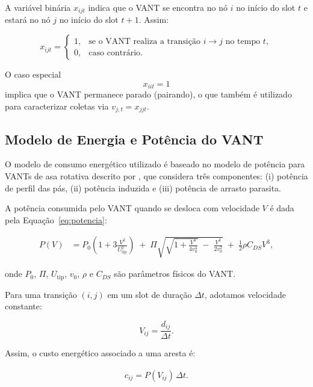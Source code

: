 \documentclass[
    12pt,
    oneside,
    a4paper,
    brazil
]{abntex2}
\begin{document}
    A variável binária $x_{ijt}$ indica que o VANT se encontra no nó $i$ no início do slot $t$ e estará no nó $j$ no início do slot $t+1$.
    Assim:

    \[
    x_{ijt} =
    \begin{cases}
    1, & \text{se o VANT realiza a transição } i \to j \text{ no tempo } t, \\[4pt]
    0, & \text{caso contrário}.
    \end{cases}
    \]

    O caso especial
    \[
    x_{iit} = 1
    \]
    implica que o VANT permanece parado (pairando), o que também é utilizado para caracterizar coletas via $v_{j,t} = x_{jjt}$.

    \subsection{Modelo de Energia e Potência do VANT}

    O modelo de consumo energético utilizado é baseado no modelo de potência para VANTs de asa rotativa descrito por \cite{zeng2019rotarywing}, que considera três componentes: (i) potência de perfil das pás, (ii) potência induzida e (iii) potência de arrasto parasita.

    A potência consumida pelo VANT quando se desloca com velocidade $V$ é dada pela Equação~\eqref{eq:potencia}:

    \begin{align}
    P(V) &=
    P_0\!\left(1 + 3\frac{V^2}{U_{\text{tip}}^2}\right)
    \;+\;
    \Pi \sqrt{
            \sqrt{1 + \frac{V^4}{4 v_0^4}}
            \;-\;
            \frac{V^2}{2 v_0^2}
        }
    \;+\;
    \frac{1}{2}\rho C_{DS} V^3 ,
    \label{eq:potencia}
    \end{align}

    onde $P_0$, $\Pi$, $U_\text{tip}$, $v_0$, $\rho$ e $C_{DS}$ são parâmetros físicos do VANT.

    Para uma transição $(i,j)$ em um slot de duração $\Delta t$, adotamos velocidade constante:

    \[
    V_{ij} = \frac{d_{ij}}{\Delta t}.
    \]

    Assim, o custo energético associado a uma aresta é:

    \begin{align}
        c_{ij} = P(V_{ij}) \, \Delta t.
        \label{eq:custo-energia}
    \end{align}
\end{document}
